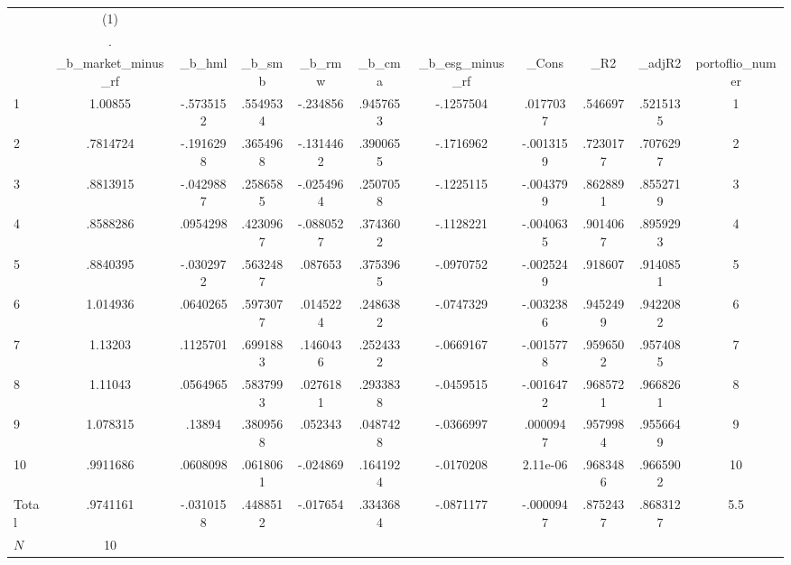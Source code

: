 {
\def\sym#1{\ifmmode^{#1}\else\(^{#1}\)\fi}
\begin{tabular}{l*{1}{cccccccccc}}
\hline\hline
            &\multicolumn{1}{c}{(1)}&            &            &            &            &            &            &            &            &            \\
            &           .&            &            &            &            &            &            &            &            &            \\
            &\_b\_market\_minus\_rf&      \_b\_hml&      \_b\_smb&      \_b\_rmw&      \_b\_cma&\_b\_esg\_minus\_rf&       \_Cons&         \_R2&      \_adjR2&portoflio\_numer\\
\hline
1           &     1.00855&   -.5735152&    .5549534&    -.234856&    .9457653&   -.1257504&    .0177037&     .546697&    .5215135&           1\\
2           &    .7814724&   -.1916298&    .3654968&   -.1314462&    .3900655&   -.1716962&   -.0013159&    .7230177&    .7076297&           2\\
3           &    .8813915&   -.0429887&    .2586585&   -.0254964&    .2507058&   -.1225115&   -.0043799&    .8628891&    .8552719&           3\\
4           &    .8588286&    .0954298&    .4230967&   -.0880527&    .3743602&   -.1128221&   -.0040635&    .9014067&    .8959293&           4\\
5           &    .8840395&   -.0302972&    .5632487&     .087653&    .3753965&   -.0970752&   -.0025249&     .918607&    .9140851&           5\\
6           &    1.014936&    .0640265&    .5973077&    .0145224&    .2486382&   -.0747329&   -.0032386&    .9452499&    .9422082&           6\\
7           &     1.13203&    .1125701&    .6991883&    .1460436&    .2524332&   -.0669167&   -.0015778&    .9596502&    .9574085&           7\\
8           &     1.11043&    .0564965&    .5837993&    .0276181&    .2933838&   -.0459515&   -.0016472&    .9685721&    .9668261&           8\\
9           &    1.078315&      .13894&    .3809568&     .052343&    .0487428&   -.0366997&    .0000947&    .9579984&    .9556649&           9\\
10          &    .9911686&    .0608098&    .0618061&    -.024869&    .1641924&   -.0170208&    2.11e-06&    .9683486&    .9665902&          10\\
Total       &    .9741161&   -.0310158&    .4488512&    -.017654&    .3343684&   -.0871177&   -.0000947&    .8752437&    .8683127&         5.5\\
\hline
\(N\)       &          10&            &            &            &            &            &            &            &            &            \\
\hline\hline
\end{tabular}
}
